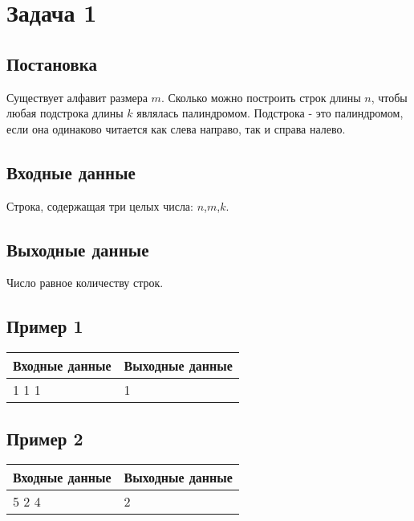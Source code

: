 \documentclass[a4]{article}
\begin{document}
\section*{Задача 1}
\label{sec:orgb62fe60}
\subsection*{Постановка}
\label{sec:org37954e9}
Существует алфавит размера \(m\). Сколько можно построить строк длины \(n\), чтобы любая подстрока длины \(k\) являлась палиндромом. Подстрока - это палиндромом, если она
одинаково читается как слева направо, так и справа налево.

\subsection*{Входные данные}
\label{sec:orgc51833b}
Строка, содержащая три целых числа: \(n\),\(m\),\(k\).

\subsection*{Выходные данные}
\label{sec:org91cd1c2}
Число равное количеству строк.

\subsection*{Пример 1}
\label{sec:org1b720b0}

\begin{table}[H]
\begin{center}
\begin{tabular}{|m{4cm}|m{4cm}|}
\hline
Входные данные & Выходные данные \\ \hline
1 1 1
&
1
\\ \hline
\end{tabular}
\end{center}
\end{table}

\subsection*{Пример 2}
\label{sec:org2aeecb4}

\begin{table}[H]
\begin{center}
\begin{tabular}{|m{4cm}|m{4cm}|}
\hline
Входные данные & Выходные данные \\ \hline
5 2 4
&
2
\\ \hline
\end{tabular}
\end{center}
\end{table}
\end{document}
